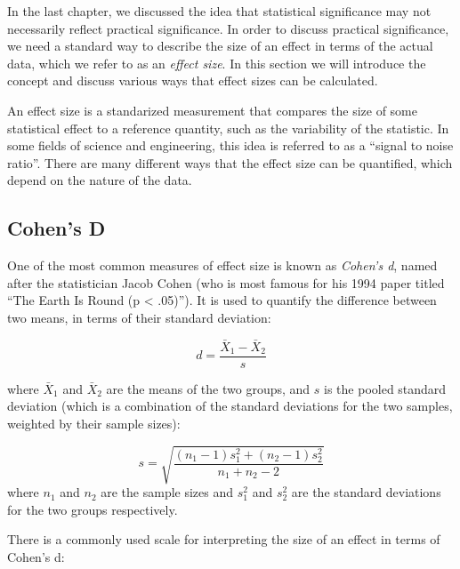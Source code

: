 \documentclass[]{book}
\theoremstyle{definition}
\theoremstyle{definition}
\theoremstyle{definition}
\theoremstyle{remark}
\begin{document}
In the last chapter, we discussed the idea that statistical significance
may not necessarily reflect practical significance. In order to discuss
practical significance, we need a standard way to describe the size of
an effect in terms of the actual data, which we refer to as an
\emph{effect size}. In this section we will introduce the concept and
discuss various ways that effect sizes can be calculated.

An effect size is a standarized measurement that compares the size of
some statistical effect to a reference quantity, such as the variability
of the statistic. In some fields of science and engineering, this idea
is referred to as a ``signal to noise ratio''. There are many different
ways that the effect size can be quantified, which depend on the nature
of the data.

\subsection{Cohen's D}\label{cohens-d}

One of the most common measures of effect size is known as \emph{Cohen's
d}, named after the statistician Jacob Cohen (who is most famous for his
1994 paper titled ``The Earth Is Round (p \textless{} .05)''). It is
used to quantify the difference between two means, in terms of their
standard deviation:

\[
d = \frac{\bar{X}_1 - \bar{X}_2}{s}
\]

where \(\bar{X}_1\) and \(\bar{X}_2\) are the means of the two groups,
and \(s\) is the pooled standard deviation (which is a combination of
the standard deviations for the two samples, weighted by their sample
sizes):

\[
s = \sqrt{\frac{(n_1 - 1)s^2_1 + (n_2 - 1)s^2_2 }{n_1 +n_2 -2}}
\] where \(n_1\) and \(n_2\) are the sample sizes and \(s^2_1\) and
\(s^2_2\) are the standard deviations for the two groups respectively.

There is a commonly used scale for interpreting the size of an effect in
terms of Cohen's d:
\end{document}
